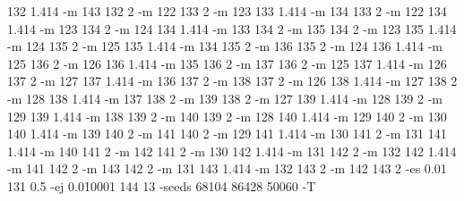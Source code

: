 \documentclass[12pt]{article}
\begin{document}
132 1.414 -m 143 132 2 -m 122 133 2 -m 123 133 1.414 -m 134 133 2 -m 122 134 1.414 -m 123 134 2 -m 124 134 1.414 -m 133 134 2 -m 135 134 2 -m 123 135 1.414 -m 124 135 2 -m 125 135 1.414 -m 134 135 2 -m 136 135 2 -m 124 136 1.414 -m 125 136 2 -m 126 136 1.414 -m 135 136 2 -m 137 136 2 -m 125 137 1.414 -m 126 137 2 -m 127 137 1.414 -m 136 137 2 -m 138 137 2 -m 126 138 1.414 -m 127 138 2 -m 128 138 1.414 -m 137 138 2 -m 139 138 2 -m 127 139 1.414 -m 128 139 2 -m 129 139 1.414 -m 138 139 2 -m 140 139 2 -m 128 140 1.414 -m 129 140 2 -m 130 140 1.414 -m 139 140 2 -m 141 140 2 -m 129 141 1.414 -m 130 141 2 -m 131 141 1.414 -m 140 141 2 -m 142 141 2 -m 130 142 1.414 -m 131 142 2 -m 132 142 1.414 -m 141 142 2 -m 143 142 2 -m 131 143 1.414 -m 132 143 2 -m 142 143 2 -es 0.01 131 0.5 -ej 0.010001 144 13 -seeds 68104 86428 50060 -T

\newpage
\end{document}
